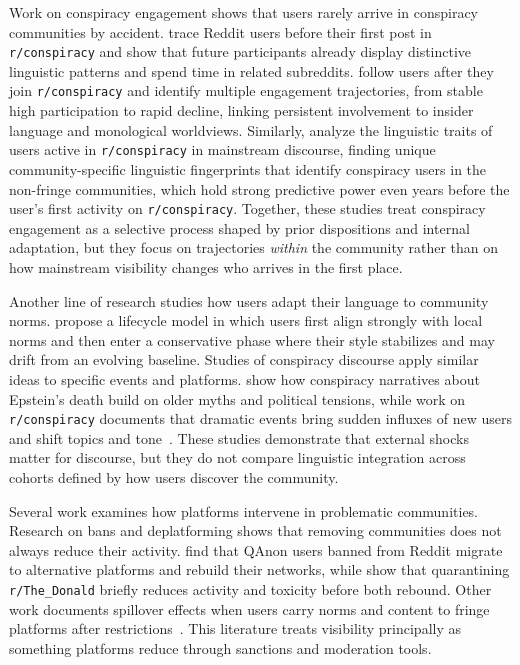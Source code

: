 \documentclass[letterpaper]{article} %
\begin{document}
Work on conspiracy engagement shows that users rarely arrive in conspiracy communities by accident.
\citet{klein_pathways_2019} trace Reddit users before their first post in \texttt{r/conspiracy} and show that future participants already display distinctive linguistic patterns and spend time in related subreddits. 
\citet{phadke_pathways_2022} follow users after they join \texttt{r/conspiracy} and identify multiple engagement trajectories, from stable high participation to rapid decline, linking persistent involvement to insider language and monological worldviews. 
Similarly, \citet{corso2025early} analyze the linguistic traits of users active in \texttt{r/conspiracy} in mainstream discourse, finding unique community-specific linguistic fingerprints that identify conspiracy users in the non-fringe communities, which hold strong predictive power even years before the user's first activity on \texttt{r/conspiracy}.
Together, these studies treat conspiracy engagement as a selective process shaped by prior dispositions and internal adaptation, but they focus on trajectories \emph{within} the community rather than on how mainstream visibility changes who arrives in the first place.

Another line of research studies how users adapt their language to community norms. 
\citet{danescu-niculescu-mizil_no_2013} propose a lifecycle model in which users first align strongly with local norms and then enter a conservative phase where their style stabilizes and may drift from an evolving baseline. 
Studies of conspiracy discourse apply similar ideas to specific events and platforms. 
\citet{schatto-eckrodt_seed_2024} show how conspiracy narratives about Epstein's death build on older myths and political tensions, while work on \texttt{r/conspiracy} documents that dramatic events bring sudden influxes of new users and shift topics and tone~\citep{samory_conspiracies_2018, de_wildt_participatory_2024}. 
These studies demonstrate that external shocks matter for discourse, but they do not compare linguistic integration across cohorts defined by how users discover the community.

Several work examines how platforms intervene in problematic communities. 
Research on bans and deplatforming shows that removing communities does not always reduce their activity. 
\citet{monti_online_2023} find that QAnon users banned from Reddit migrate to alternative platforms and rebuild their networks, while \citet{trujillo_make_2022} show that quarantining \texttt{r/The\_Donald} briefly reduces activity and toxicity before both rebound. 
Other work documents spillover effects when users carry norms and content to fringe platforms after restrictions~\citep{horta_ribeiro_deplatforming_2023, russo_spillover_2023}. 
This literature treats visibility principally as something platforms reduce through sanctions and moderation tools.
\end{document}
